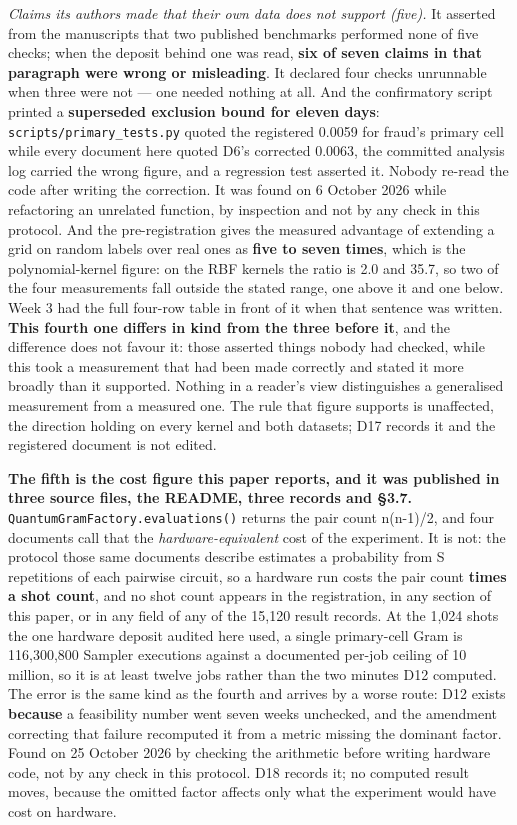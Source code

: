 \documentclass[
  10pt,
]{article}
\newcounter{none} %
\begin{document}
\emph{Claims its authors made that their own data does not support
(five).} It asserted from the manuscripts that two published benchmarks
performed none of five checks; when the deposit behind one was read,
\textbf{six of seven claims in that paragraph were wrong or misleading}.
It declared four checks unrunnable when three were not --- one needed
nothing at all. And the confirmatory script printed a \textbf{superseded
exclusion bound for eleven days}: \texttt{scripts/\allowbreak{}primary\_\allowbreak{}tests.py}
quoted the registered 0.0059 for fraud's primary cell while every
document here quoted D6's corrected 0.0063, the committed analysis log
carried the wrong figure, and a regression test asserted it. Nobody
re-read the code after writing the correction. It was found on 6 October
2026 while refactoring an unrelated function, by inspection and not by
any check in this protocol. And the pre-registration gives the measured
advantage of extending a grid on random labels over real ones as
\textbf{five to seven times}, which is the polynomial-kernel figure: on
the RBF kernels the ratio is 2.0 and 35.7, so two of the four
measurements fall outside the stated range, one above it and one below.
Week 3 had the full four-row table in front of it when that sentence was
written. \textbf{This fourth one differs in kind from the three before
it}, and the difference does not favour it: those asserted things nobody
had checked, while this took a measurement that had been made correctly
and stated it more broadly than it supported. Nothing in a reader's view
distinguishes a generalised measurement from a measured one. The rule
that figure supports is unaffected, the direction holding on every
kernel and both datasets; D17 records it and the registered document is
not edited.

\textbf{The fifth is the cost figure this paper reports, and it was
published in three source files, the README, three records and \S{}3.7.}
\texttt{QuantumGramFactory.evaluations()} returns the pair count
n(n-1)/2, and four documents call that the \emph{hardware-equivalent}
cost of the experiment. It is not: the protocol those same documents
describe estimates a probability from S repetitions of each pairwise
circuit, so a hardware run costs the pair count \textbf{times a shot
count}, and no shot count appears in the registration, in any section of
this paper, or in any field of any of the 15,120 result records. At the
1,024 shots the one hardware deposit audited here used, a single
primary-cell Gram is 116,300,800 Sampler executions against a documented
per-job ceiling of 10 million, so it is at least twelve jobs rather than
the two minutes D12 computed. The error is the same kind as the fourth
and arrives by a worse route: D12 exists \textbf{because} a feasibility
number went seven weeks unchecked, and the amendment correcting that
failure recomputed it from a metric missing the dominant factor. Found
on 25 October 2026 by checking the arithmetic before writing hardware
code, not by any check in this protocol. D18 records it; no computed
result moves, because the omitted factor affects only what the
experiment would have cost on hardware.
\end{document}
